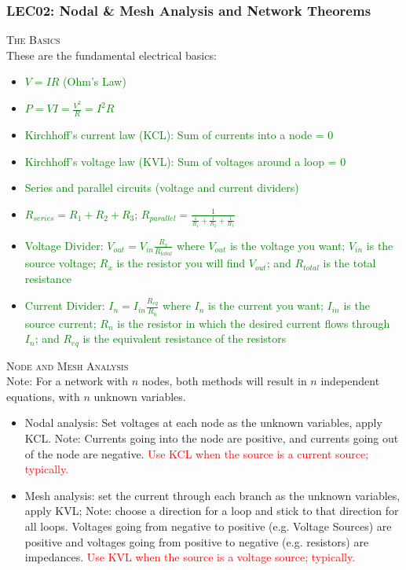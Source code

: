 \subsubsection{LEC02: Nodal \& Mesh Analysis and Network Theorems}
\textsc{\large The Basics}\\
These are the fundamental electrical basics:
\begin{itemize}
  \item \textcolor{green}{$V = IR$ (Ohm's Law)}
  \item \textcolor{green}{$P = VI = \frac{V^2}{R} = I^2R$}
  \item \textcolor{green}{Kirchhoff's current law (KCL): Sum of currents into a node = 0}
  \item \textcolor{green}{Kirchhoff's voltage law (KVL): Sum of voltages around a loop = 0}
  \item \textcolor{green}{Series and parallel circuits (voltage and current dividers)}
  \item \textcolor{green}{$R_{series} = R_1 + R_2 + R_3$; $R_{parallel} = \frac{1}{\frac{1}{R_1} + \frac{1}{R_2} + \frac{1}{R_3}}$}
  \item \textcolor{green}{Voltage Divider: $V_{out} = V_{in}\frac{R_x}{R_{total}}$ where $V_{out}$ is the voltage you want; $V_{in}$ is the source voltage; $R_x$ is the resistor you will find $V_{out}$; and $R_{total}$ is the total resistance}
  \item \textcolor{green}{Current Divider: $I_{n} = I_{in}\frac{R_{eq}}{R_{n}}$ where $I_{n}$ is the current you want; $I_{in}$ is the source current; $R_n$ is the resistor in which the desired current flows through $I_{n}$; and $R_{eq}$ is the equivalent resistance of the resistors}
\end{itemize}

\textsc{\large Node and Mesh Analysis}\\
Note: For a network with $n$ nodes, both methods will result in $n$ independent equations, with $n$ unknown variables.
\begin{itemize}
  \item Nodal analysis: Set voltages at each node as the unknown variables, apply KCL. Note: Currents going into the node are positive, and currents going out of the node are negative. \textcolor{red}{Use KCL when the source is a current source; typically.}
  \item Mesh analysis: set the current through each branch as the unknown variables, apply KVL;  Note: choose a direction for a loop and stick to that direction for all loops. Voltages going from negative to positive (e.g. Voltage Sources) are positive and voltages going from positive to negative (e.g. resistors) are impedances. \textcolor{red}{Use KVL when the source is a voltage source; typically.}
\end{itemize}

